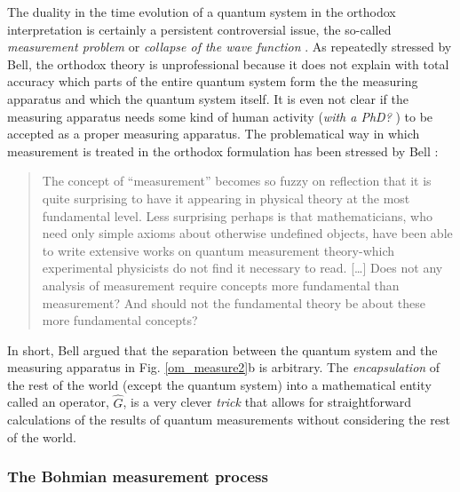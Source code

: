 \documentclass[onecolumn,nofootinbib, secnumarabic, amsmath, nobibnotes,12pt,aps,pra]{revtex4-1}
\newcommand{\fref}[1]{Fig. \ref{#1}}
\begin{document}
The duality in the time evolution of a quantum system in the orthodox interpretation is certainly a persistent controversial issue, the so-called \textit{measurement problem} or \textit{collapse of the wave function} \cite{om.bell1990,om.extra15}. As repeatedly stressed by Bell, the orthodox theory is unprofessional because it does not explain with total accuracy which parts of the entire quantum system form the the measuring apparatus and which the quantum system itself. It is even not clear if the measuring apparatus needs some kind of human activity (\textit{with a PhD?} \cite{om.bell1990}) to be accepted as a proper measuring apparatus. The problematical way in which measurement is treated in the orthodox formulation has been stressed by Bell \cite{om.Bell1987}:
\begin{quote}
The concept of ``measurement'' becomes so fuzzy on reflection that it is quite surprising to have it appearing in physical theory at the most fundamental level. Less surprising perhaps is that mathematicians, who need only simple axioms about otherwise undefined objects, have been able to write extensive works on quantum measurement theory-which experimental physicists do not find it necessary to read. [\ldots] Does not any analysis of measurement require concepts more fundamental than measurement? And should not the fundamental theory be about these more fundamental concepts?
\end{quote}
In short, Bell argued that the separation between the quantum
system and the measuring apparatus in \fref{om_measure2}b is
arbitrary. The \textit{encapsulation} of the rest of the world (except
the quantum system) into a mathematical entity called an operator,
$\hat{G}$\!, is a very clever \textit{trick} that allows for
straightforward calculations of the results of quantum measurements
\cite{om.Durrnaive,om.goldstein} without considering the rest of
the  world.

\subsubsection{The Bohmian measurement process}
\end{document}
